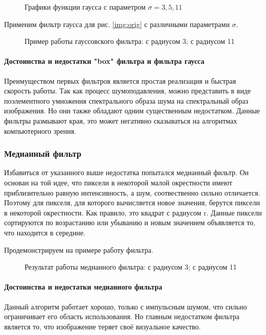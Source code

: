\begin{figure}[H]
	\caption{Графики функции гаусса с параметром $\sigma = 3,5,11$}
\end{figure}

Применим фильтр гаусса для рис. \ref{img:orig} с различными параметрами $\sigma$.

\begin{figure}[h]
	\centering {}
	\hspace{4ex}
	\caption{Пример работы гауссовского фильтра:  с радиусом 3;  с радиусом 11}
\end{figure}

\paragraph{Достоинства и недостатки "box" фильтра и фильтра гаусса}

Преимуществом первых фильтров является простая реализация и быстрая скорость работы. Так как процесс шумоподавления, можно представить в виде поэлементного умножения спектрального образа шума на спектральный образ изображения. Но они также обладают одним существенным недостатком. Данные фильтры размывают края, это может негативно сказываться на алгоритмах компьютерного зрения.
\subsubsection{Медианный фильтр}
Избавиться от указанного выше недостатка попытался медианный фильтр. Он основан на той идее, что пиксели в некоторой малой окрестности имеют приблизительно равную интенсивность, а шум, соотвественно сильно отличается. Поэтому для пикселя, для которого вычисляется новое значения, берутся пиксели в некоторой окрестности. Как правило, это квадрат с радиусом r. Данные пиксели сортируются по возрастанию или убыванию и новым значением объявляется то, что находится в середине.

Продемонстрируем на примере работу фильтра.

\begin{figure}[H]
\centering {}
\hspace{4ex}
	\caption{Результат работы медианного фильтра:  с радиусом 3;  с радиусом 11}
\end{figure}
\paragraph{Достоинства и недостатки медианного фильтра}
Данный алгоритм работает хорошо, только с импульсным шумом, что сильно ограничивает его область использования. Но главным недостатком фильтра является то, что изображение теряет своё визуальное качество.
